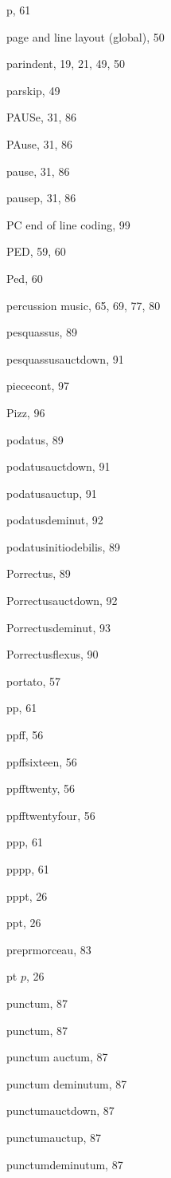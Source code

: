 \begin{theindex}
  \item {\Bslash p}, 61
  \item page and line layout (global), 50
  \item {\Bslash parindent}, 19, 21, 49, 50
  \item {\Bslash parskip}, 49
  \item {\Bslash PAUSe}, 31, 86
  \item {\Bslash PAuse}, 31, 86
  \item {\Bslash pause}, 31, 86
  \item {\Bslash pausep}, 31, 86
  \item PC end of line coding, 99
  \item {\Bslash PED}, 59, 60
  \item {\Bslash Ped}, 60
  \item percussion music, 65, 69, 77, 80
  \item {\Bslash pesquassus}, 89
  \item {\Bslash pesquassusauctdown}, 91
  \item {\Bslash piececont}, 97
  \item {\Bslash Pizz}, 96
  \item {\Bslash podatus}, 89
  \item {\Bslash podatusauctdown}, 91
  \item {\Bslash podatusauctup}, 91
  \item {\Bslash podatusdeminut}, 92
  \item {\Bslash podatusinitiodebilis}, 89
  \item {\Bslash Porrectus}, 89
  \item {\Bslash Porrectusauctdown}, 92
  \item {\Bslash Porrectusdeminut}, 93
  \item {\Bslash Porrectusflexus}, 90
  \item portato, 57
  \item {\Bslash pp}, 61
  \item {\Bslash ppff}, 56
  \item {\Bslash ppffsixteen}, 56
  \item {\Bslash ppfftwenty}, 56
  \item {\Bslash ppfftwentyfour}, 56
  \item {\Bslash ppp}, 61
  \item {\Bslash pppp}, 61
  \item {\Bslash pppt}, 26
  \item {\Bslash ppt}, 26
  \item {\Bslash preprmorceau}, 83
  \item {\Bslash pt $p$}, 26
  \item punctum, 87
  \item {\Bslash punctum}, 87
  \item punctum auctum, 87
  \item punctum deminutum, 87
  \item {\Bslash punctumauctdown}, 87
  \item {\Bslash punctumauctup}, 87
  \item {\Bslash punctumdeminutum}, 87


\end{theindex}
